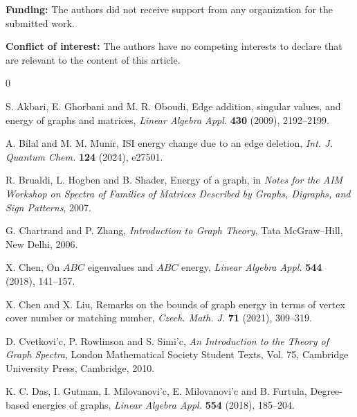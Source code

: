 \documentclass[12pt,twoside]{article}
\begin{document}
 \noindent \textbf{Funding:} The authors did not receive support from any organization for the submitted work.
 
 \noindent \textbf{Conflict of interest:} The authors have no competing interests to declare that are relevant to the content of this article.
 

\begin{thebibliography}{0}
	
	
	S. Akbari, E. Ghorbani and M. R. Oboudi,
	Edge addition, singular values, and energy of graphs and matrices,
	\emph{Linear Algebra Appl.} \textbf{430} (2009), 2192--2199.
	
	A. Bilal and M. M. Munir,
	ISI energy change due to an edge deletion,
	\emph{Int. J. Quantum Chem.} \textbf{124} (2024), e27501.
	
	R. Brualdi, L. Hogben and B. Shader,
	Energy of a graph,
	in \emph{Notes for the AIM Workshop on Spectra of Families of Matrices Described by Graphs, Digraphs, and Sign Patterns}, 2007.
	
	G. Chartrand and P. Zhang,
	\emph{Introduction to Graph Theory},
	Tata McGraw--Hill, New Delhi, 2006.
	
	X. Chen,
	On $ABC$ eigenvalues and $ABC$ energy,
	\emph{Linear Algebra Appl.} \textbf{544} (2018), 141--157.
	
	X. Chen and X. Liu,
	Remarks on the bounds of graph energy in terms of vertex cover number or matching number,
	\emph{Czech. Math. J.} \textbf{71} (2021), 309--319.
	
	D. Cvetkovi'c, P. Rowlinson and S. Simi'c,
	\emph{An Introduction to the Theory of Graph Spectra},
	London Mathematical Society Student Texts, Vol. 75,
	Cambridge University Press, Cambridge, 2010.
	
	K. C. Das, I. Gutman, I. Milovanovi'c, E. Milovanovi'c and B. Furtula,
	Degree-based energies of graphs,
	\emph{Linear Algebra Appl.} \textbf{554} (2018), 185--204.
	

\end{thebibliography}
\end{document}
